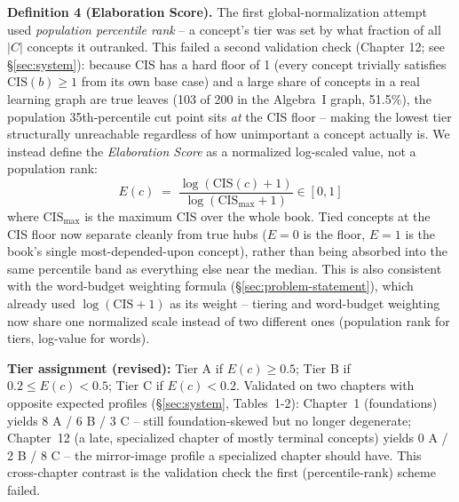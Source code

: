 \textbf{Definition 4 (Elaboration Score).}
The first global-normalization attempt used \emph{population percentile
rank} -- a concept's tier was set by what fraction of all $|C|$ concepts it
outranked. This failed a second validation check (Chapter 12; see
\S\ref{sec:system}): because CIS has a hard floor of 1 (every concept
trivially satisfies $\mathrm{CIS}(b) \geq 1$ from its own base case) and a
large share of concepts in a real learning graph are true leaves (103 of 200
in the Algebra~I graph, 51.5\%), the population 35th-percentile cut point
sits \emph{at} the CIS floor -- making the lowest tier structurally
unreachable regardless of how unimportant a concept actually is. We instead
define the \emph{Elaboration Score} as a normalized log-scaled value, not a
population rank:
\[
E(c) \;=\; \frac{\log(\mathrm{CIS}(c) + 1)}{\log(\mathrm{CIS}_{\max} + 1)} \in [0, 1]
\]
where $\mathrm{CIS}_{\max}$ is the maximum CIS over the whole book. Tied
concepts at the CIS floor now separate cleanly from true hubs ($E=0$ is the
floor, $E=1$ is the book's single most-depended-upon concept), rather than
being absorbed into the same percentile band as everything else near the
median. This is also consistent with the word-budget weighting formula
(\S\ref{sec:problem-statement}), which already used $\log(\mathrm{CIS}+1)$ as
its weight -- tiering and word-budget weighting now share one normalized
scale instead of two different ones (population rank for tiers, log-value for
words).

\textbf{Tier assignment (revised):} Tier A if $E(c) \geq 0.5$; Tier B if
$0.2 \leq E(c) < 0.5$; Tier C if $E(c) < 0.2$. Validated on two chapters with
opposite expected profiles (\S\ref{sec:system}, Tables~1-2): Chapter~1
(foundations) yields 8 A / 6 B / 3 C -- still foundation-skewed but no longer
degenerate; Chapter~12 (a late, specialized chapter of mostly terminal
concepts) yields 0 A / 2 B / 8 C -- the mirror-image profile a specialized
chapter should have. This cross-chapter contrast is the validation check the
first (percentile-rank) scheme failed.

%

